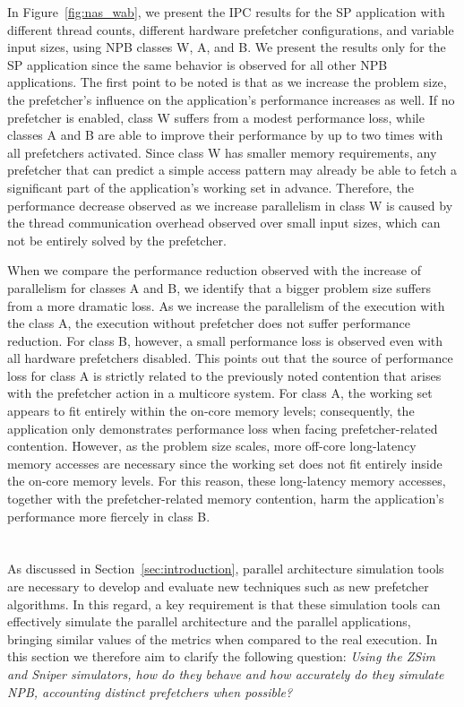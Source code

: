 \documentclass[AMA,final,STIX1COL]{WileyNJD-v2}
\newcommand\new[1]{{\color{red}{#1}}}
\begin{document}
{In Figure~\ref{fig:nas_wab}, we present the IPC results for the SP application with different thread counts, different hardware prefetcher configurations, and variable input sizes, using NPB classes W, A, and B.
We present the results only for the SP application since the same behavior is observed for all other NPB applications.
The first point to be noted is that as we increase the problem size, the prefetcher's influence on the application's performance increases as well. 
If no prefetcher is enabled, class W suffers from a modest performance loss, while classes A and B are able to improve their performance by up to two times with all prefetchers activated.
Since class W has smaller memory requirements, any prefetcher that can predict a simple access pattern may already be able to fetch a significant part of the application's working set in advance.
Therefore, the performance decrease observed as we increase parallelism in class W is caused by the thread communication overhead observed over small input sizes, which can not be entirely solved by the prefetcher.

When we compare the performance reduction observed with the increase of parallelism for classes A and B, we identify that a bigger problem size suffers from a more dramatic loss.
As we increase the parallelism of the execution with the class A, the execution without prefetcher does not suffer performance reduction.
For class B, however, a small performance loss is observed even with all hardware prefetchers disabled.
This points out that the source of performance loss for class A is strictly related to the previously noted contention that arises with the prefetcher action in a multicore system.
For class A, the working set appears to fit entirely within the on-core memory levels; consequently, the application only demonstrates performance loss when facing prefetcher-related contention.
However, as the problem size scales, more off-core long-latency memory accesses are necessary since the working set does not fit entirely inside the on-core memory levels.
For this reason, these long-latency memory accesses, together with the prefetcher-related memory contention, harm the application's performance more fiercely in class B.
}

\section{\new{Investigating Prefetchers on Simulation}}\label{sec:simulation}

As discussed in Section~\ref{sec:introduction}, parallel architecture simulation tools are necessary to develop and evaluate new techniques such as new prefetcher algorithms. In this regard, a key requirement is that these simulation tools can effectively simulate the parallel architecture and the parallel applications, bringing similar values of the metrics when compared to the real execution. In this section we therefore aim to clarify the following question: \textit{Using the ZSim and Sniper simulators, how do they behave and how accurately do they simulate NPB, accounting distinct prefetchers when possible?}
\end{document}
